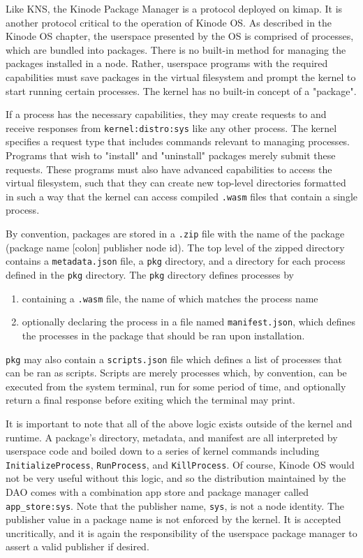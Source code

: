 \documentclass[runningheads]{llncs}
\begin{document}
Like KNS, the Kinode Package Manager is a protocol deployed on kimap.
It is another protocol critical to the operation of Kinode OS.
As described in the Kinode OS chapter, the userspace presented by the OS is comprised of processes, which are bundled into packages.
There is no built-in method for managing the packages installed in a node.
Rather, userspace programs with the required capabilities must save packages in the virtual filesystem and prompt the kernel to start running certain processes.
The kernel has no built-in concept of a "package".

If a process has the necessary capabilities, they may create requests to and receive responses from \verb|kernel:distro:sys| like any other process.
The kernel specifies a request type that includes commands relevant to managing processes.
Programs that wish to "install" and "uninstall" packages merely submit these requests.
These programs must also have advanced capabilities to access the virtual filesystem, such that they can create new top-level directories formatted in such a way that the kernel can access compiled \verb|.wasm| files that contain a single process.

By convention, packages are stored in a \verb|.zip| file with the name of the package (package name [colon] publisher node id).
The top level of the zipped directory contains a \verb|metadata.json| file, a \verb|pkg| directory, and a directory for each process defined in the \verb|pkg| directory.
The \verb|pkg| directory defines processes by
\begin{enumerate}
    \item containing a \verb|.wasm| file, the name of which matches the process name
    \item optionally declaring the process in a file named \verb|manifest.json|, which defines the processes in the package that should be ran upon installation.
\end{enumerate}

\verb|pkg| may also contain a \verb|scripts.json| file which defines a list of processes that can be ran as scripts.
Scripts are merely processes which, by convention, can be executed from the system terminal, run for some period of time, and optionally return a final response before exiting which the terminal may print.

It is important to note that all of the above logic exists outside of the kernel and runtime.
A package's directory, metadata, and manifest are all interpreted by userspace code and boiled down to a series of kernel commands including \verb|InitializeProcess|, \verb|RunProcess|, and \verb|KillProcess|.
Of course, Kinode OS would not be very useful without this logic, and so the distribution maintained by the DAO comes with a combination app store and package manager called \verb|app_store:sys|.
Note that the publisher name, \verb|sys|, is not a node identity.
The publisher value in a package name is not enforced by the kernel.
It is accepted uncritically, and it is again the responsibility of the userspace package manager to assert a valid publisher if desired.
\end{document}
